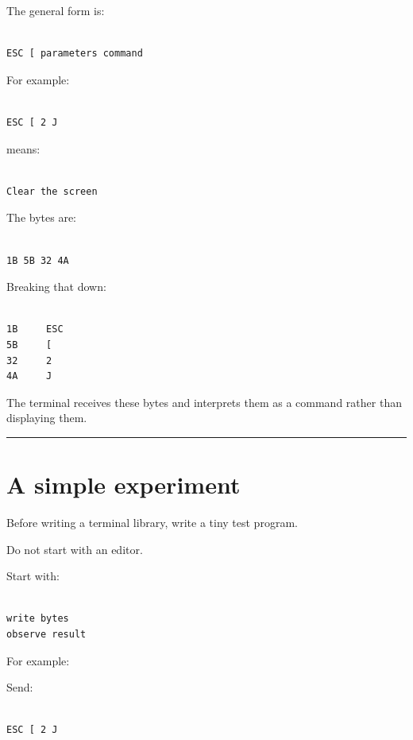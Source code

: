 \documentclass[
  oneside,
  openany]{book}
\begin{document}
The general form is:

\begin{verbatim}

ESC [ parameters command
\end{verbatim}

For example:

\begin{verbatim}

ESC [ 2 J
\end{verbatim}

means:

\begin{verbatim}

Clear the screen
\end{verbatim}

The bytes are:

\begin{verbatim}

1B 5B 32 4A
\end{verbatim}

Breaking that down:

\begin{verbatim}

1B     ESC
5B     [
32     2
4A     J
\end{verbatim}

The terminal receives these bytes and interprets them as a command
rather than displaying them.

\begin{center}\rule{0.5\linewidth}{0.5pt}\end{center}

\hypertarget{a-simple-experiment}{%
\section{A simple experiment}\label{a-simple-experiment}}

Before writing a terminal library, write a tiny test program.

Do not start with an editor.

Start with:

\begin{verbatim}

write bytes
observe result
\end{verbatim}

For example:

Send:

\begin{verbatim}

ESC [ 2 J
\end{verbatim}
\end{document}
